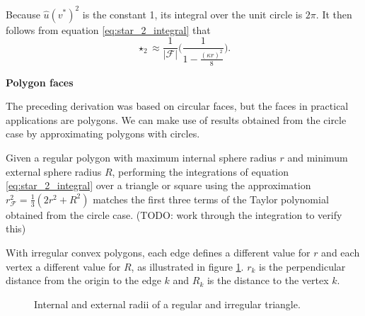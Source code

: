 \documentclass[utf8,english]{gradu3}
\begin{document}
Because $\hat{u}(v^*)^2$ is the constant 1, its integral over the unit circle is $2\pi$.
It then follows from equation \eqref{eq:star_2_integral} that
\begin{equation}\label{eq:star_2_harmonic}
  \star_2 \approx \frac{1}{|\mathcal{F}|}
  \Big( \frac{1}{1 - \frac{(\kappa r)^2}{8}} \Big).
\end{equation}

\textbf{Polygon faces}

The preceding derivation was based on circular faces,
but the faces in practical applications are polygons.
We can make use of results obtained from the circle case
by approximating polygons with circles.

Given a regular polygon with maximum internal sphere radius $r$
and minimum external sphere radius $R$,
performing the integrations of equation \eqref{eq:star_2_integral}
over a triangle or square
using the approximation $r^2_{\mathcal{F}} = \frac{1}{3} (2r^2 + R^2)$
matches the first three terms of the Taylor polynomial obtained from the circle case.
(TODO: work through the integration to verify this)

With irregular convex polygons, each edge defines a different value for $r$
and each vertex a different value for $R$,
as illustrated in figure \ref{fig:polygon_radii}.
$r_k$ is the perpendicular distance from the origin to the edge $k$
and $R_k$ is the distance to the vertex $k$.

\begin{figure}[h]
  \centering
  \caption{Internal and external radii of a regular and irregular triangle.}
  \label{fig:polygon_radii}
\end{figure}
\end{document}
